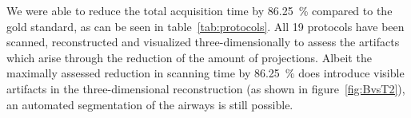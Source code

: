 We were able to reduce the total acquisition time by \SI{86.25}{\percent} compared to the gold standard, as can be seen in table~\ref{tab:protocols}. All 19 protocols have been scanned, reconstructed and visualized three-dimensionally to assess the artifacts which arise through the reduction of the amount of projections. Albeit the maximally assessed reduction in scanning time by \SI{86.25}{\percent} does introduce visible artifacts in the three-dimensional reconstruction (as shown in figure~\ref{fig:BvsT2}), an automated segmentation of the airways is still possible.


